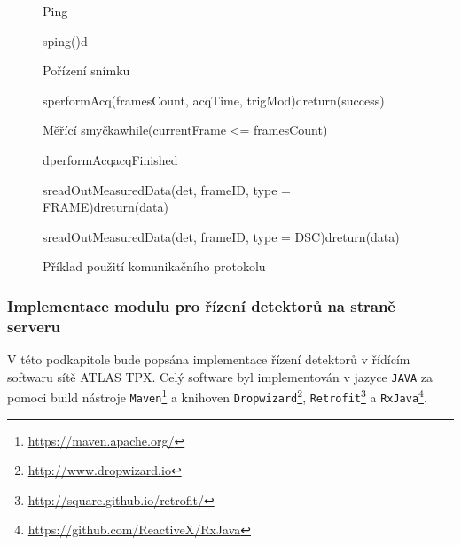 \begin{figure}[t]
	\begin{center}
		\begin{sequencediagram}
			\begin{sdblock}{Ping}{}
				\begin{call}{s}{ping()}{d}{}
				\end{call}
			\end{sdblock}
			\begin{sdblock}{Pořízení snímku}{}
				\begin{call}{s}{performAcq(framesCount, acqTime, trigMod)}{d}{return(success)}	
				\end{call}
				\begin{sdblock}{Měřící smyčka}{while(currentFrame <= framesCount)}
					\begin{callself}{d}{performAcq}{acqFinished}
					\end{callself}
					\begin{call}{s}{readOutMeasuredData(det, frameID, type = FRAME)}{d}{return(data)}
					\end{call}
					\begin{call}{s}{readOutMeasuredData(det, frameID, type = DSC)}{d}{return(data)}
					\end{call}
				\end{sdblock}
			\end{sdblock}
		\end{sequencediagram}
		\caption{Příklad použití komunikačního protokolu}
		\label{fig:uml:com_priklad}
	\end{center}
\end{figure}


\subsubsection{Implementace modulu pro řízení detektorů na straně serveru}\label{atlas:cont:impl}
V této podkapitole bude popsána implementace řízení detektorů v řídícím softwaru sítě ATLAS TPX. Celý software byl implementován v jazyce \texttt{JAVA} za pomoci build nástroje \texttt{Maven}\footnote{\url{https://maven.apache.org/}} a knihoven \texttt{Dropwizard}\footnote{\url{http://www.dropwizard.io}}, \texttt{Retrofit}\footnote{\url{http://square.github.io/retrofit/}} a \texttt{RxJava}\footnote{\url{https://github.com/ReactiveX/RxJava}}.

